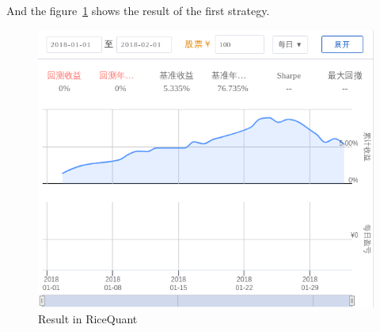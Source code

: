 And the figure~\ref{F:ricequant-getting-started} shows the result of the first strategy.
\begin{figure}
    \centering
    \includegraphics[width=\textwidth]{figures/2019-09-17-qicequant.jpg}
    \caption{Result in RiceQuant}\label{F:ricequant-getting-started}
\end{figure}




